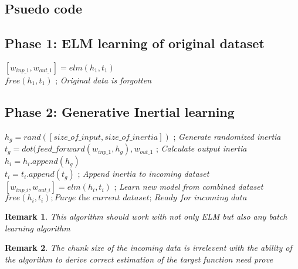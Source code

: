\documentclass[11pt]{article}
\newtheorem{remark}{Remark}
\begin{document}
\begin{flushleft}
\section*{Psuedo code}
\subsection*{Phase 1: ELM learning of original dataset}
$[w_{inp\_1},w_{out\_1}] = elm(h_1, t_1)$ \\
$free(h_1,t_1)$  ; \textit{Original data is forgotten}
\subsection*{Phase 2: Generative Inertial learning}
$h_g = rand([size\_of\_input, size\_of\_inertia])$ ; \textit{Generate randomized inertia}\\
$t_g = dot(feed\_forward(w_{inp\_1}, h_g), w_{out\_1}$ ; \textit{Calculate output inertia}\\
$h_i = h_i.append(h_g)$\\
$t_i = t_i.append(t_g)$ ; \textit{Append inertia to incoming dataset}\\
$[w_{inp\_i}, w_{out\_i}] = elm(h_i, t_i)$ ; \textit{Learn new model from combined dataset}\\
$free(h_i, t_i) ; \textit{Purge the current dataset; Ready for incoming data}$\par
\begin{remark} This algorithm should work with not only ELM but also any batch learning algorithm\end{remark}
\begin{remark} The chunk size of the incoming data is irrelevent with the ability of the algorithm to derive correct estimation of the target function \textit{need prove}\end{remark}
\end{flushleft}
\end{document}
